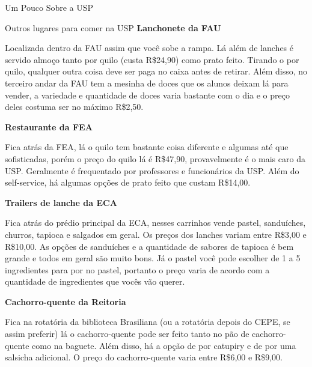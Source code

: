 \begin{secao}{Um Pouco Sobre a USP}
\begin{subsecao}{Outros lugares para comer na USP}
{\bf Lanchonete da FAU}

Localizada dentro da FAU assim que você sobe a rampa. Lá além de lanches é servido almoço
tanto por quilo (custa R\$24,90) como prato feito. Tirando o por quilo, qualquer outra coisa
deve ser paga no caixa antes de retirar. Além disso, no terceiro andar da FAU tem a mesinha
de doces que os alunos deixam lá para vender, a variedade e quantidade de doces varia bastante
com o dia e o preço deles costuma ser no máximo R\$2,50.

{\bf Restaurante da FEA}

Fica atrás da FEA, lá o quilo tem bastante coisa diferente e algumas até que sofisticadas,
porém o preço do quilo lá é R\$47,90, provavelmente é o mais caro da USP. Geralmente
é frequentado por professores e funcionários da USP. Além do self-service, há algumas opções 
de prato feito que custam R\$14,00.

{\bf Trailers de lanche da ECA}

Fica atrás do prédio principal da ECA, nesses carrinhos vende pastel, sanduíches, churros, 
tapioca e salgados em geral. Os preços dos lanches variam entre R\$3,00 e R\$10,00. As opções de
sanduíches e a quantidade de sabores de tapioca é bem grande e todos em geral são muito bons.
Já o pastel você pode escolher de 1 a 5 ingredientes para por no pastel, portanto o preço
varia de acordo com a quantidade de ingredientes que vocês vão querer.

{\bf Cachorro-quente da Reitoria}

Fica na rotatória da biblioteca Brasiliana (ou a rotatória depois do CEPE, se assim preferir)
lá o cachorro-quente pode ser feito tanto no pão de cachorro-quente como na baguete. Além disso,
há a opção de por catupiry e de por uma salsicha adicional. O preço do cachorro-quente varia
entre R\$6,00 e R\$9,00.

\end{subsecao}

\end{secao}
